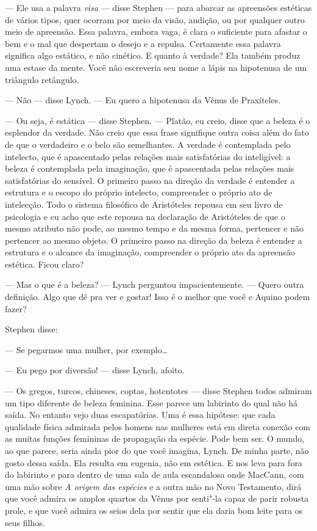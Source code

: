  --- Ele usa a palavra \textit{visa} --- disse Stephen --- para abarcar as
apreensões estéticas de vários tipos, quer ocorram por meio da visão,
audição, ou por qualquer outro meio de apreensão. Essa palavra, embora
vaga, é clara o suficiente para afastar o bem e o mal que despertam o
desejo e a repulsa. Certamente essa palavra significa algo estático, e
não cinético. E quanto à verdade? Ela também produz uma estase da
mente. Você não escreveria seu nome a lápis na hipotenusa de um
triângulo retângulo.

 --- Não --- disse Lynch. --- Eu quero a hipotenusa da Vênus de Praxíteles.

 --- Ou seja, é estática --- disse Stephen. --- Platão, eu creio, disse que a
beleza é o esplendor da verdade. Não creio que essa frase signifique
outra coisa além do fato de que o verdadeiro e o belo são semelhantes.
A verdade é contemplada pelo intelecto, que é apascentado pelas
relações mais satisfatórias do inteligível: a beleza é contemplada pela
imaginação, que é apascentada pelas relações mais satisfatórias do
sensível. O primeiro passo na direção da verdade é entender a estrutura
e o escopo do próprio intelecto, compreender o próprio ato de
intelecção. Todo o sistema filosófico de Aristóteles repousa em seu
livro de psicologia e eu acho que este repousa na declaração de
Aristóteles de que o mesmo atributo não pode, ao mesmo tempo e da mesma
forma, pertencer e não pertencer ao mesmo objeto. O primeiro passo na
direção da beleza é entender a estrutura e o alcance da imaginação,
compreender o próprio ato da apreensão estética. Ficou claro?

 --- Mas o que é a beleza? --- Lynch perguntou impacientemente. --- Quero outra
definição. Algo que dê pra ver e gostar! Isso é o melhor que você e
Aquino podem fazer?

Stephen disse:

 --- Se pegarmos uma mulher, por exemplo\ldots{}

 --- Eu pego por diversão! --- disse Lynch, afoito.

 --- Os gregos, turcos, chineses, coptas, hotentotes --- disse Stephen  todos
admiram um tipo diferente de beleza feminina. Esse parece um labirinto
do qual não há saída. No entanto vejo duas escapatórias. Uma é essa
hipótese: que cada qualidade física admirada pelos homens nas mulheres
está em direta conexão com as muitas funções femininas de propagação da
espécie. Pode bem ser. O mundo, ao que parece, seria ainda pior do que
você imagina, Lynch. De minha parte, não gosto dessa saída. Ela resulta
em eugenia, não em estética. E nos leva para fora do labirinto e para
dentro de uma sala de aula escandalosa onde MacCann, com uma mão sobre
\textit{A origem das espécies}  e a outra mão no Novo Testamento, dirá que você admira os amplos quartos da
Vênus por senti"-la capaz de parir robusta prole, e que você admira os seios
dela por sentir que ela daria bom leite para os seus filhos.

